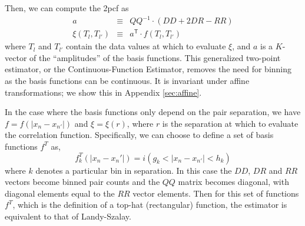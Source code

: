 \documentclass[modern]{aastex62}
\newcommand{\cf}{2pcf\xspace} %
\newcommand{\est}{the Continuous-Function Estimator\xspace}
\newcommand{\inv}{^{-1}}
\newcommand{\T}{^{\mathsf{T}}}
\begin{document}
Then, we can compute the \cf as
\begin{eqnarray}\displaystyle
a &\equiv& QQ\inv \cdot (DD + 2DR - RR) \\
\xi(T_l, T_{l'}) &\equiv& a\T \cdot f(T_l, T_{l'})
\end{eqnarray}
where $T_l$ and $T_{l'}$ contain the data values at which to evaluate $\xi$, and $a$ is a $K$-vector of the ``amplitudes'' of the basis functions.
This generalized two-point estimator, or \est, removes the need for binning as the basis functions can be continuous.
It is invariant under affine transformations; we show this in Appendix \ref{sec:affine}.

%

In the case where the basis functions only depend on the pair separation, we have $f = f(|x_n - x_{n'}|)$ and $\xi = \xi(r)$, where $r$ is the separation at which to evaluate the correlation function.
Specifically, we can choose to define a set of basis functions $f^T$ as,
\begin{equation}
f^T_k(|x_n - x_n'|) =  i(g_k < |x_n - x_{n'}| < h_k)
\end{equation}
where $k$ denotes a particular bin in separation.
In this case the $DD$, $DR$ and $RR$ vectors become binned pair counts and the $QQ$ matrix becomes diagonal, with diagonal elements equal to the $RR$ vector elements. %
Then for this set of functions $f^T$, which is the definition of a top-hat (rectangular) function, the estimator is equivalent to that of Landy-Szalay.
\end{document}
